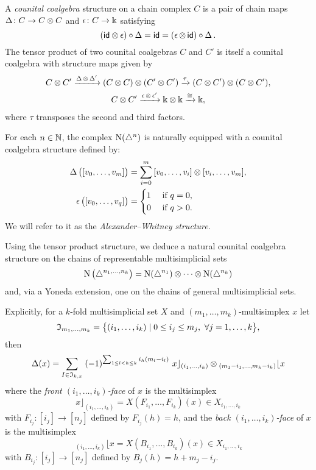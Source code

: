 A \textit{counital coalgebra} structure on a chain complex $C$ is a pair of chain maps $\copr \colon C \to C \ot C$ and $\aug \colon C \to \k$ satisfying
\[
(\id \ot \aug) \circ \copr =
\id =
(\aug \ot\, \id) \circ \copr.
\]
The tensor product of two counital coalgebras $C$ and $C'$ is itself a counital coalgebra with structure maps given by
\begin{gather*}
	C \ot C^\prime \xra{\copr \ot \copr^\prime}
	(C \ot C) \ot (C^\prime \ot C^\prime) \xra{\tau}
	(C \ot C^\prime) \ot (C \ot C^\prime), \\
	C \ot C^\prime \xra{\aug \ot \aug^\prime}
	\k \ot \k \xra{\cong} \k,
\end{gather*}
where $\tau$ transposes the second and third factors.

For each $n \in \N$, the complex $\chains(\simplex^n)$ is naturally equipped with a counital coalgebra structure defined by:
\[
\begin{split}
	\copr \big( [v_0, \dots, v_m] \big) &=
	\sum_{i=0}^m \, [v_0, \dots, v_i] \ot [v_i, \dots, v_m], \\
	\aug \big( [v_0, \dots, v_q] \big) &=
	\begin{cases} 1 & \text{ if } q = 0, \\ 0 & \text{ if } q>0. \end{cases}
\end{split}
\]
We will refer to it as the \textit{Alexander--Whitney structure}.

Using the tensor product structure, we deduce a natural counital coalgebra structure on the chains of representable multisimplicial sets
\[
\chains \big( \simplex^{n_1, \dots, n_k} \big) =
\chains(\simplex^{n_1}) \ot \dotsb \ot \chains(\simplex^{n_k})
\]
and, via a Yoneda extension, one on the chains of general multisimplicial sets.

Explicitly, for a $k$-fold multisimplicial set $X$ and $(m_1,\dots,m_k)$-multisimplex $x$ let
\[
\fI_{m_1,\dots,m_k} = \set[\big]{(i_{1},\dots,i_{k}) \mid 0 \le i_j \le m_j,\ \forall j = 1,\dots,k},
\]
then
\[
\copr(x) =
\sum_{I\in \mathfrak{I}_{k,x}} \;
(-1)^{\sum_{1 \leq l<h \leq k} i_h (m_l-i_l) } \
x \rfloor_{(i_{1},\dots,i_{k})} \ot
\!\,_{(m_{1}-i_{1}, \dots, m_{k}-i_{k})} \lfloor x
\]
where the \textit{front $(i_1,\dots,i_k)$-face} of $x$ is the multisimplex
\[
x \rfloor_{(i_{1}, \dots, i_{k})} =
X(F_{i_1}, \dots, F_{i_k})(x) \in X_{i_1,\dots,i_k}
\]
with
$F_{i_j} \colon [i_j] \to [n_j]$ defined by $F_{i_j}(h)=h$, and the \textit{back $(i_1,\dots,i_k)$-face} of $x$ is the multisimplex
\[
\,_{(i_{1}, \dots, i_{k})} \lfloor x =
X(B_{i_1}, \dots, B_{i_k})(x) \in X_{i_1,\dots,i_k}
\]
with $B_{i_j} \colon [i_j] \to [n_j]$ defined by $B_j(h) = h+m_j-i_j$.

